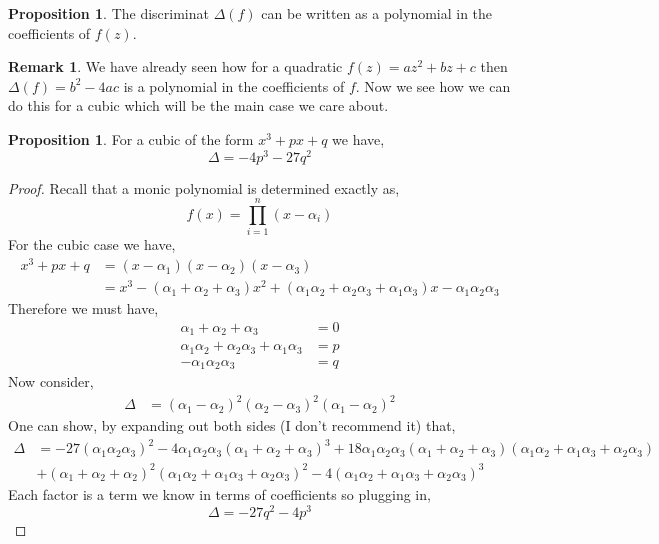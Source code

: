 \documentclass{article}
\theoremstyle{definition}
\newtheorem{proposition}[theorem]{Proposition}
\newtheorem{remark}{Remark}[section]
\begin{document}
\begin{proposition}
The discriminat $\Delta(f)$ can be written as a polynomial in the coefficients of $f(z)$.
\end{proposition}

\begin{remark}
We have already seen how for a quadratic $f(z) = a z^2 + b z + c$ then $\Delta(f) = b^2 - 4 a c$ is a polynomial in the coefficients of $f$. Now we see how we can do this for a cubic which will be the main case we care about.
\end{remark}

\begin{proposition}
For a cubic of the form $x^3 + p x + q$ we have,
\[ \Delta = - 4 p^3 - 27 q^2 \]
\end{proposition}

\begin{proof}
Recall that a monic polynomial is determined exactly as,
\[ f(x) = \prod_{i = 1}^n (x - \alpha_i) \]
For the cubic case we have,
\begin{align*}
x^3 + p x + q & = (x -  \alpha_1)(x - \alpha_2)(x - \alpha_3) 
\\
& = x^3 - (\alpha_1 + \alpha_2 + \alpha_3) x^2 + (\alpha_1 \alpha_2 + \alpha_2 \alpha_3 + \alpha_1 \alpha_3) x - \alpha_1 \alpha_2 \alpha_3 
\end{align*}
Therefore we must have,
\begin{align*}
\alpha_1 + \alpha_2 + \alpha_3 & = 0
\\
\alpha_1 \alpha_2 + \alpha_2 \alpha_3 + \alpha_1 \alpha_3 & = p
\\
-\alpha_1 \alpha_2 \alpha_3 & = q
\end{align*}
Now consider,
\begin{align*}
\Delta & = (\alpha_1 - \alpha_2)^2 (\alpha_2 - \alpha_3)^2 (\alpha_1 - \alpha_2)^2
\end{align*}
One can show, by expanding out both sides (I don't recommend it) that,
\begin{align*}
\Delta & = - 27 (\alpha_1 \alpha_2 \alpha_3)^2 - 4 \alpha_1 \alpha_2 \alpha_3 (\alpha_1 + \alpha_2 + \alpha_3)^3 + 18 \alpha_1 \alpha_2 \alpha_3 (\alpha_1 + \alpha_2 + \alpha_3)(\alpha_1 \alpha_2  + \alpha_1 \alpha_3 + \alpha_2 \alpha_3) 
\\
& + (\alpha_1 + \alpha_2 + \alpha_2)^2 (\alpha_1 \alpha_2 + \alpha_1 \alpha_3 + \alpha_2 \alpha_3)^2 - 4 (\alpha_1 \alpha_2 + \alpha_1 \alpha_3 + \alpha_2 \alpha_3)^3
\end{align*}
Each factor is a term we know in terms of coefficients so plugging in,
\[ \Delta = - 27 q^2 - 4 p^3 \]
\end{proof}
\end{document}
